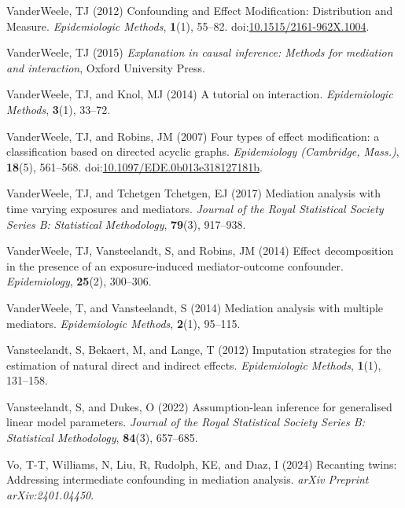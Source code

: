 \documentclass[
  single column]{article}
\newlength{\cslhangindent}
\newenvironment{CSLReferences}[2] %
 {\begin{list}{}{%
  \setlength{\itemindent}{0pt}
  \setlength{\leftmargin}{0pt}
  \setlength{\parsep}{0pt}
  \ifodd #1
   \setlength{\leftmargin}{\cslhangindent}
   \setlength{\itemindent}{-1\cslhangindent}
  \fi
  \setlength{\itemsep}{#2\baselineskip}}}
 {\end{list}}
\begin{document}
\begin{CSLReferences}{1}{0}
VanderWeele, TJ (2012) Confounding and Effect Modification: Distribution
and Measure. \emph{Epidemiologic Methods}, \textbf{1}(1), 55--82.
doi:\href{https://doi.org/10.1515/2161-962X.1004}{10.1515/2161-962X.1004}.

VanderWeele, TJ (2015) \emph{Explanation in causal inference: Methods
for mediation and interaction}, Oxford University Press.

VanderWeele, TJ, and Knol, MJ (2014) A tutorial on interaction.
\emph{Epidemiologic Methods}, \textbf{3}(1), 33--72.

VanderWeele, TJ, and Robins, JM (2007) Four types of effect
modification: a classification based on directed acyclic graphs.
\emph{Epidemiology (Cambridge, Mass.)}, \textbf{18}(5), 561--568.
doi:\href{https://doi.org/10.1097/EDE.0b013e318127181b}{10.1097/EDE.0b013e318127181b}.

VanderWeele, TJ, and Tchetgen Tchetgen, EJ (2017) Mediation analysis
with time varying exposures and mediators. \emph{Journal of the Royal
Statistical Society Series B: Statistical Methodology}, \textbf{79}(3),
917--938.

VanderWeele, TJ, Vansteelandt, S, and Robins, JM (2014) Effect
decomposition in the presence of an exposure-induced mediator-outcome
confounder. \emph{Epidemiology}, \textbf{25}(2), 300--306.

VanderWeele, T, and Vansteelandt, S (2014) Mediation analysis with
multiple mediators. \emph{Epidemiologic Methods}, \textbf{2}(1),
95--115.

Vansteelandt, S, Bekaert, M, and Lange, T (2012) Imputation strategies
for the estimation of natural direct and indirect effects.
\emph{Epidemiologic Methods}, \textbf{1}(1), 131--158.

Vansteelandt, S, and Dukes, O (2022) Assumption-lean inference for
generalised linear model parameters. \emph{Journal of the Royal
Statistical Society Series B: Statistical Methodology}, \textbf{84}(3),
657--685.

Vo, T-T, Williams, N, Liu, R, Rudolph, KE, and Dıaz, I (2024) Recanting
twins: Addressing intermediate confounding in mediation analysis.
\emph{arXiv Preprint arXiv:2401.04450}.


\end{CSLReferences}
\end{document}
